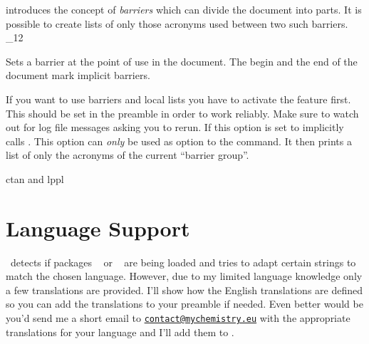 \documentclass[load-preamble+]{cnltx-doc}
\makeatletter
\renewenvironment{commands}
  {%
    \cnltx@set@catcode_{12}%
    \let\command\cnltx@command
    \cnltxlist
  }
  {\endcnltxlist}
\newcommand*\mailto[1]{\texttt{\href{mailto:#1}{#1}}}
\makeatother
\begin{document}
\acro{} introduces the concept of \emph{barriers} which can
divide the document into parts. It is possible to create lists of only those
acronyms used between two such barriers.
\begin{commands}
  \command{acbarrier}
    Sets a barrier at the point of use in the document.  The begin and the end
    of the document mark implicit barriers.
\end{commands}
\begin{options}
    If you want to use barriers and local lists you have to
    activate the feature first.  This should be set in the preamble in order
    to work reliably.  Make sure to watch out for log file messages asking you
    to rerun.
    If this option is set to   implicitly calls
    .
    This option can \emph{only} be used as option to the 
    command. It then prints a list of only the acronyms of the current
    \enquote{barrier group}.
\end{options}

\begin{example}
  \acbarrier
  \ac{ctan} and \ac{lppl}
  \acbarrier
\end{example}

\section{Language Support}
\acro\ detects if packages ~\cite{pkg:babel} or
~\cite{pkg:babel} are being loaded and tries to adapt certain
strings to match the chosen language.  However, due to my limited language
knowledge only a few translations are provided.  I'll show how the English
translations are defined so you can add the translations to your preamble if
needed.  Even better would be you'd send me a short email to
\mailto{contact@mychemistry.eu} with the appropriate translations for your
language and I'll add them to \acro.

\begin{sourcecode}
\end{sourcecode}
\end{document}
